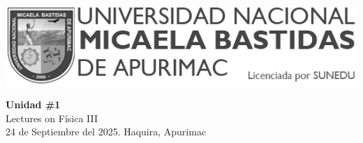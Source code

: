 


\begin{minipage}[l]{0.42\textwidth}
    \includegraphics[width=1\textwidth]{img/logo-UNAMBA.png}
\end{minipage}
\hfill
\begin{minipage}[c]{0.5\textwidth}
    \begin{flushright}
	\large{\textbf{Unidad \#1}}\\
	\large{Lectures on Física III}\\
	\large{24 de Septiembre del 2025. Haquira, Apurimac}\\
    \end{flushright}
\end{minipage}


  
